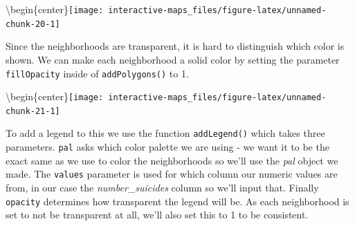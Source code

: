 \documentclass[
  12pt,
]{book}
\newenvironment{Shaded}{\begin{snugshade}}{\end{snugshade}}
\newcommand{\DataTypeTok}[1]{\textcolor[rgb]{0.13,0.29,0.53}{#1}}
\newcommand{\DecValTok}[1]{\textcolor[rgb]{0.00,0.00,0.81}{#1}}
\newcommand{\KeywordTok}[1]{\textcolor[rgb]{0.13,0.29,0.53}{\textbf{#1}}}
\newcommand{\NormalTok}[1]{#1}
\newcommand{\OperatorTok}[1]{\textcolor[rgb]{0.81,0.36,0.00}{\textbf{#1}}}
\newcommand{\StringTok}[1]{\textcolor[rgb]{0.31,0.60,0.02}{#1}}
\begin{document}
\textbackslash begin\{center\}\texttt{[image: interactive-maps\_files/figure-latex/unnamed-chunk-20-1]}

Since the neighborhoods are transparent, it is hard to distinguish which color is shown. We can make each neighborhood a solid color by setting the parameter \texttt{fillOpacity} inside of \texttt{addPolygons()} to 1.

\begin{Shaded}
\end{Shaded}

\textbackslash begin\{center\}\texttt{[image: interactive-maps\_files/figure-latex/unnamed-chunk-21-1]}

To add a legend to this we use the function \texttt{addLegend()} which takes three parameters. \texttt{pal} asks which color palette we are using - we want it to be the exact same as we use to color the neighborhoods so we'll use the \emph{pal} object we made. The \texttt{values} parameter is used for which column our numeric values are from, in our case the \emph{number\_suicides} column so we'll input that. Finally \texttt{opacity} determines how transparent the legend will be. As each neighborhood is set to not be transparent at all, we'll also set this to 1 to be consistent.
\end{document}
